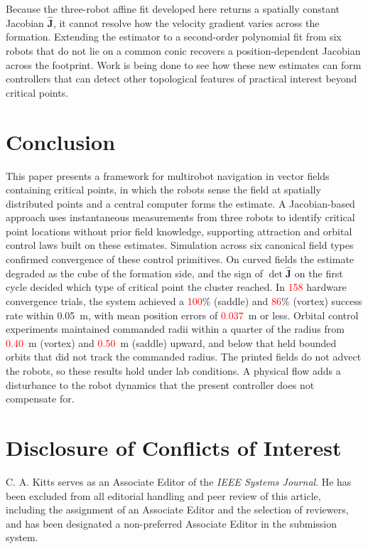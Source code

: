 \documentclass[lettersize,journal]{IEEEtran}
\newcommand{\syn}[1]{\textcolor{red}{#1}}            %
\begin{document}
Because the three-robot affine fit developed here returns a spatially constant Jacobian $\hat{\mathbf{J}}$, it cannot resolve how the velocity gradient varies across the formation. Extending the estimator to a second-order polynomial fit from six robots that do not lie on a common conic recovers a position-dependent Jacobian across the footprint. Work is being done to see how these new estimates can form controllers that can detect other topological features of practical interest beyond critical points.



\section{Conclusion}
\noindent

This paper presents a framework for multirobot navigation in vector fields containing critical points, in which the robots sense the field at spatially distributed points and a central computer forms the estimate. A Jacobian-based approach uses instantaneous measurements from three robots to identify critical point locations without prior field knowledge, supporting attraction and orbital control laws built on these estimates. Simulation across six canonical field types confirmed convergence of these control primitives. On curved fields the estimate degraded as the cube of the formation side, and the sign of $\det\hat{\mathbf{J}}$ on the first cycle decided which type of critical point the cluster reached. In \syn{158} hardware convergence trials, the system achieved a \syn{100}\% (saddle) and \syn{86}\% (vortex) success rate within 0.05~m, with mean position errors of \syn{0.037}~m or less. Orbital control experiments maintained commanded radii within a quarter of the radius from \syn{0.40}~m (vortex) and \syn{0.50}~m (saddle) upward, and below that held bounded orbits that did not track the commanded radius. %
The printed fields do not advect the robots, so these results hold under lab conditions. A physical flow adds a disturbance to the robot dynamics that the present controller does not compensate for.


\section*{Disclosure of Conflicts of Interest}

C. A. Kitts serves as an Associate Editor of the \textit{IEEE Systems Journal}. He has been excluded from all editorial handling and peer review of this article, including the assignment of an Associate Editor and the selection of reviewers, and has been designated a non-preferred Associate Editor in the submission system.
\end{document}
